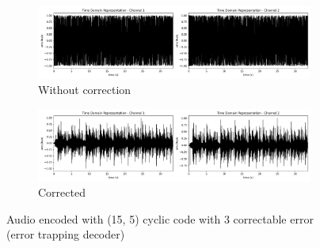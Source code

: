 \documentclass{article}
\begin{document}
\begin{figure}[htb]
    \centering
    \begin{subfigure}[b]{\textwidth}
        \centering
        \includegraphics[width=\textwidth]{../Result/Cyclic/15-5/cyclic-bsc-wav-time-domain-RX.png}
        \caption{Without correction}
        \label{fig:t-audio-cyclic-15-5-no-correction}
    \end{subfigure}
    \begin{subfigure}[b]{\textwidth}
        \centering
        \includegraphics[width=\textwidth]{../Result/Cyclic/15-5/cyclic-bsc-wav-time-domain-RX-trapping-corrected.png}
        \caption{Corrected}
        \label{fig:t-audio-cyclic-15-5-trapping-corrected}
    \end{subfigure}
       \caption{Audio encoded with (15, 5) cyclic code with 3 correctable error (error trapping decoder)}
       \label{fig:t-audio-cyclic-15-5-trapping}
\end{figure}

 
% 
\end{document}
